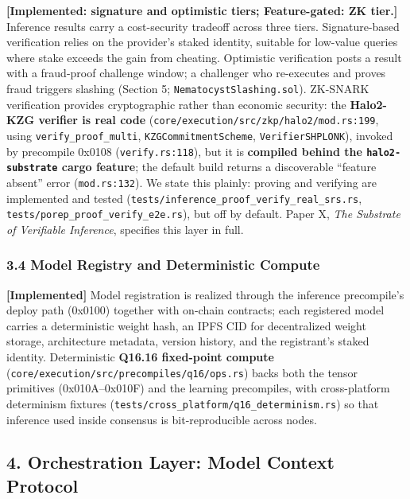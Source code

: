 \textbf{{[}Implemented: signature and optimistic tiers; Feature-gated:
ZK tier.{]}} Inference results carry a cost-security tradeoff across
three tiers. Signature-based verification relies on the provider's
staked identity, suitable for low-value queries where stake exceeds the
gain from cheating. Optimistic verification posts a result with a
fraud-proof challenge window; a challenger who re-executes and proves
fraud triggers slashing (Section 5; \texttt{NematocystSlashing.sol}).
ZK-SNARK verification provides cryptographic rather than economic
security: the \textbf{Halo2-KZG verifier is real code}
(\texttt{core/execution/src/zkp/halo2/mod.rs:199}, using
\texttt{verify\_proof\_multi}, \texttt{KZGCommitmentScheme},
\texttt{VerifierSHPLONK}), invoked by precompile 0x0108
(\texttt{verify.rs:118}), but it is \textbf{compiled behind the
\texttt{halo2-substrate} cargo feature}; the default build returns a
discoverable ``feature absent'' error (\texttt{mod.rs:132}). We state
this plainly: proving and verifying are implemented and tested
(\texttt{tests/inference\_proof\_verify\_real\_srs.rs},
\texttt{tests/porep\_proof\_verify\_e2e.rs}), but off by default. Paper
X, \emph{The Substrate of Verifiable Inference}, specifies this layer in
full.

\subsubsection{3.4 Model Registry and Deterministic
Compute}\label{model-registry-and-deterministic-compute}

\textbf{{[}Implemented{]}} Model registration is realized through the
inference precompile's deploy path (0x0100) together with on-chain
contracts; each registered model carries a deterministic weight hash, an
IPFS CID for decentralized weight storage, architecture metadata,
version history, and the registrant's staked identity. Deterministic
\textbf{Q16.16 fixed-point compute}
(\texttt{core/execution/src/precompiles/q16/ops.rs}) backs both the
tensor primitives (0x010A--0x010F) and the learning precompiles, with
cross-platform determinism fixtures
(\texttt{tests/cross\_platform/q16\_determinism.rs}) so that inference
used inside consensus is bit-reproducible across nodes.

\subsection{4. Orchestration Layer: Model Context
Protocol}\label{orchestration-layer-model-context-protocol}

